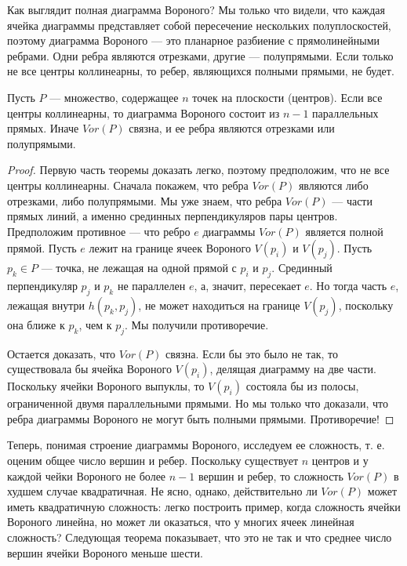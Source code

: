 Как  выглядит  полная  диаграмма  Вороного? 
Мы  только что  видели,  что  каждая  ячейка  диаграммы  представляет  собой  пересечение  нескольких  полуплоскостей,  поэтому  диаграмма  Вороного  ---  это планарное  разбиение  с  прямолинейными  ребрами.
Одни  ребра  являются  отрезками,  другие  ---  полупрямыми. 
Если  только  не  все  центры  коллинеарны,  то  ребер, являющихся  полными  прямыми,  не  будет.

\begin{theorem}
    Пусть $P$ --- множество, содержащее  $n$  точек  на  плоскости  (центров). 
    Если  все центры  коллинеарны,  то  диаграмма  Вороного  состоит  из $n - 1$  параллельных  прямых. 
    Иначе  $Vor(P)$ связна,  и  ее  ребра  являются  отрезками  или  полупрямыми.
\end{theorem}
\begin{proof}
    Первую  часть  теоремы  доказать  легко,  поэтому  предположим,  что  не  все  центры коллинеарны.
    Сначала  покажем,  что  ребра  $Vor(P)$  являются  либо  отрезками,  либо  полупрямыми. 
    Мы  уже  знаем,  что  ребра  $Vor(P)$  ---  части  прямых  линий,  а  именно  срединных перпендикуляров  пары  центров. 
    Предположим  противное  ---  что  ребро $e$ диаграммы $Vor(P)$ является  полной  прямой. 
    Пусть  $e$  лежит  на  границе ячеек  Вороного $V(p_i)$ и $V(p_j)$.
    Пусть $p_k \in P$  ---  точка,  не  лежащая на  одной  прямой  с  $p_i$ и $p_j$.
    Срединный  перпендикуляр  $p_j$  и  $p_k$  не параллелен  $e$,  а,  значит,  пересекает  $e$. 
    Но  тогда  часть  $e$,  лежащая внутри  $h(p_k,  p_j)$,  не  может  находиться  на  границе  $V(p_j)$,  поскольку  она  ближе  к  $p_k$,  чем  к  $p_j$.
    Мы  получили  противоречие.

    Остается  доказать,  что  $Vor(P)$  связна. 
    Если  бы  это  было  не так,  то  существовала  бы  ячейка  Вороного  $V(p_i)$,  делящая  диаграмму  на  две  части. 
    Поскольку  ячейки  Вороного  выпуклы,  то  $V(p_i)$  состояла  бы  из  полосы,  ограниченной  двумя  параллельными  прямыми.
    Но  мы  только  что  доказали,  что  ребра  диаграммы  Вороного  не  могут  быть  полными  прямыми. 
    Противоречие!
\end{proof}

Теперь,  понимая  строение  диаграммы  Вороного,  исследуем  ее  сложность,  т.  е.  оценим  общее  число  вершин  и  ребер. 
Поскольку  существует  $n$  центров  и  у  каждой чейки  Вороного  не  более  $n - 1$  вершин  и  ребер,  то  сложность $Vor(P)$  в  худшем случае  квадратичная. 
Не  ясно,  однако,  действительно  ли  $Vor(P)$  может  иметь  квадратичную  сложность:  легко  построить  пример,  когда  сложность  ячейки  Вороного линейна,  но  может  ли  оказаться,  что  у  многих  ячеек  линейная  сложность? 
Следующая  теорема  показывает,  что  это  не  так  и  что  среднее  число  вершин  ячейки Вороного  меньше  шести.

